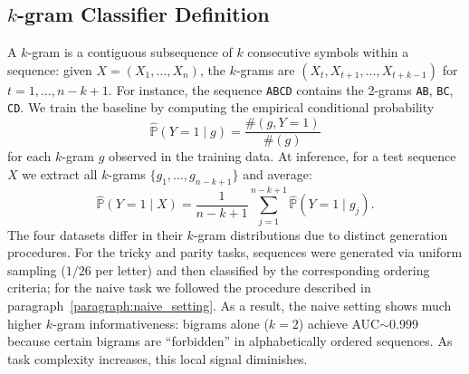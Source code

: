 \documentclass{article}
\theoremstyle{plain}
\theoremstyle{definition}
\theoremstyle{remark}
\begin{document}
\subsection{$k$-gram Classifier Definition}
\label{subsec:kgram}
A $k$-gram is a contiguous subsequence of $k$ consecutive symbols within a sequence: given $X = (X_1, \ldots, X_n)$, the $k$-grams are $(X_t, X_{t+1}, \ldots, X_{t+k-1})$ for $t = 1, \ldots, n-k+1$. For instance, the sequence \texttt{ABCD} contains the 2-grams \texttt{AB}, \texttt{BC}, \texttt{CD}. We train the baseline by computing the empirical conditional probability
\begin{equation}
\hat{\mathbb{P}}(Y=1 \mid g) = \frac{\#(g, Y=1)}{\#(g)}
\end{equation}
for each $k$-gram $g$ observed in the training data. At inference, for a test sequence $X$ we extract all $k$-grams $\{g_1, \ldots, g_{n-k+1}\}$ and average:
\begin{equation}
\hat{\mathbb{P}}(Y=1 \mid X) = \frac{1}{n-k+1} \sum_{j=1}^{n-k+1} \hat{\mathbb{P}}(Y=1 \mid g_j).
\end{equation}
The four datasets differ in their $k$-gram distributions due to distinct generation procedures. For the tricky and parity tasks, sequences were generated via uniform sampling ($1/26$ per letter) and then classified by the corresponding ordering criteria; for the naive task we followed the procedure described in paragraph~\ref{paragraph:naive_setting}. As a result, the naive setting shows much higher $k$-gram informativeness: bigrams alone ($k=2$) achieve AUC$\sim$0.999 because certain bigrams are ``forbidden'' in alphabetically ordered sequences. As task complexity increases, this local signal diminishes.
\end{document}
